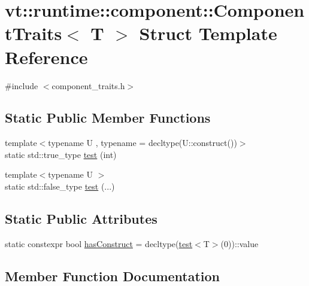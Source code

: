 \hypertarget{structvt_1_1runtime_1_1component_1_1_component_traits}{}\section{vt\+:\+:runtime\+:\+:component\+:\+:Component\+Traits$<$ T $>$ Struct Template Reference}
\label{structvt_1_1runtime_1_1component_1_1_component_traits}


{\ttfamily \#include $<$component\+\_\+traits.\+h$>$}

\subsection*{Static Public Member Functions}
\begin{DoxyCompactItemize}
\item 
{\footnotesize template$<$typename U , typename  = decltype(\+U\+::construct())$>$ }\\static std\+::true\+\_\+type \hyperlink{structvt_1_1runtime_1_1component_1_1_component_traits_a9c457498be041dcab634bf1665e63a25}{test} (int)
\item 
{\footnotesize template$<$typename U $>$ }\\static std\+::false\+\_\+type \hyperlink{structvt_1_1runtime_1_1component_1_1_component_traits_ac1c10ab56a5d4d979c4db8e0e07377a3}{test} (...)
\end{DoxyCompactItemize}
\subsection*{Static Public Attributes}
\begin{DoxyCompactItemize}
\item 
static constexpr bool \hyperlink{structvt_1_1runtime_1_1component_1_1_component_traits_acdb8f8598d2317e5d6b4206bdbf682b5}{has\+Construct} = decltype(\hyperlink{structvt_1_1runtime_1_1component_1_1_component_traits_a9c457498be041dcab634bf1665e63a25}{test}$<$T$>$(0))\+::value
\end{DoxyCompactItemize}


\subsection{Member Function Documentation}
\mbox{\label{structvt_1_1runtime_1_1component_1_1_component_traits_a9c457498be041dcab634bf1665e63a25}} 
